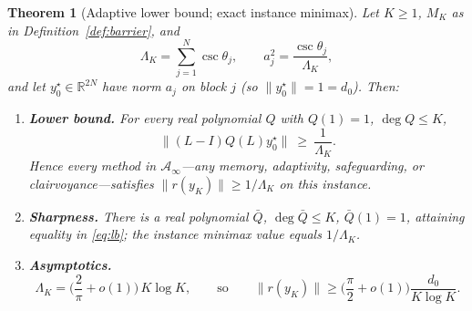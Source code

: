 \documentclass[11pt]{article}
\newtheorem{theorem}{Theorem}[section]
\theoremstyle{definition}
\theoremstyle{remark}
\newcommand{\Aa}{\mathcal{A}}
\newcommand{\R}{\mathbb{R}}
\newcommand{\norm}[1]{\| #1 \|}
\begin{document}
\begin{theorem}[Adaptive lower bound; exact instance minimax]\label{thm:mainlb}
Let $K\ge1$, $M_K$ as in Definition~\ref{def:barrier}, and
\begin{equation}\label{eq:masses}
\Lambda_K=\sum_{j=1}^{N}\csc\theta_j,
\qquad
a_j^2=\frac{\csc\theta_j}{\Lambda_K},
\end{equation}
and let $y_0^\star\in\R^{2N}$ have norm $a_j$ on block $j$ (so
$\norm{y_0^\star}=1=d_0$). Then:
\begin{enumerate}[label=(\roman*)]
\item \textbf{Lower bound.} For every real polynomial $Q$ with $Q(1)=1$,
      $\deg Q\le K$,
      \begin{equation}\label{eq:lb}
      \norm{(L-I)Q(L)y_0^\star}\ \ge\ \frac1{\Lambda_K}.
      \end{equation}
      Hence every method in $\Aa_\infty$---any memory, adaptivity,
      safeguarding, or clairvoyance---satisfies
      $\norm{r(y_K)}\ge 1/\Lambda_K$ on this instance.
\item \textbf{Sharpness.} There is a real polynomial $\bar Q$, $\deg\bar
      Q\le K$, $\bar Q(1)=1$, attaining equality in \eqref{eq:lb}; the
      instance minimax value equals $1/\Lambda_K$.
\item \textbf{Asymptotics.}
      \begin{equation}\label{eq:lamasymp}
      \Lambda_K=\Big(\frac{2}{\pi}+o(1)\Big)\,K\log K,
      \qquad\text{so}\qquad
      \norm{r(y_K)}\ge \Big(\frac{\pi}{2}+o(1)\Big)\frac{d_0}{K\log K}.
      \end{equation}
\end{enumerate}
\end{theorem}
\end{document}

